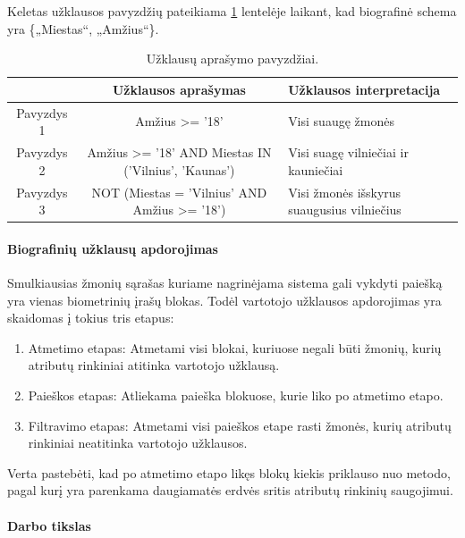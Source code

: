Keletas užklausos pavyzdžių pateikiama \ref{tab:queryExamples} lentelėje laikant, kad biografinė schema yra \{„Miestas“, „Amžius“\}.

\begin{table}[H]\footnotesize
	\centering
	\begin{tabular}{|c|c|l|}
		\hline
		& {\bf Užklausos aprašymas} & {\bf Užklausos interpretacija} \\
		\hline
		Pavyzdys 1 & Amžius >= '18' & Visi suaugę žmonės\\
		\hline
		Pavyzdys 2 & Amžius >= '18' AND Miestas IN ('Vilnius', 'Kaunas') & Visi suagę vilniečiai ir kauniečiai\\
		\hline
		Pavyzdys 3 & NOT (Miestas = 'Vilnius' AND Amžius >= '18') & Visi žmonės išskyrus suaugusius vilniečius\\
		\hline
	\end{tabular}
	\caption{Užklausų aprašymo pavyzdžiai.}
	\label{tab:queryExamples}
\end{table}



\paragraph{Biografinių užklausų apdorojimas}

Smulkiausias žmonių sąrašas kuriame nagrinėjama sistema gali vykdyti paiešką yra vienas biometrinių įrašų blokas.
Todėl vartotojo užklausos apdorojimas yra skaidomas į tokius tris etapus:
\begin{enumerate}
	\item Atmetimo etapas: Atmetami visi blokai, kuriuose negali būti žmonių, kurių atributų rinkiniai atitinka vartotojo užklausą.
	\item Paieškos etapas: Atliekama paieška blokuose, kurie liko po atmetimo etapo.
	\item Filtravimo etapas: Atmetami visi paieškos etape rasti žmonės, kurių atributų rinkiniai neatitinka vartotojo užklausos.
\end{enumerate}

Verta pastebėti, kad po atmetimo etapo likęs blokų kiekis priklauso nuo metodo, pagal kurį yra parenkama daugiamatės erdvės sritis atributų rinkinių saugojimui.



\paragraph{Darbo tikslas}

